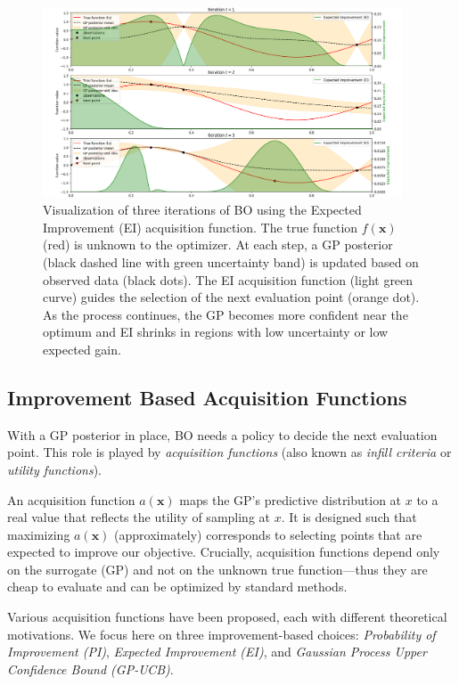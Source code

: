 \documentclass{ut-thesis}
\begin{document}
\begin{figure}[htbp]
    \centering
    \includegraphics[width=0.95\textwidth]{Bo_visual.png}
    \caption[Bayesian Optimization with Expected Improvement]{
        Visualization of three iterations of BO using the Expected Improvement (EI) acquisition function. 
        The true function \( f(\mathbf{x}) \) (red) is unknown to the optimizer. At each step, a GP posterior (black dashed line with green uncertainty band) is updated based on observed data (black dots). 
        The EI acquisition function (light green curve) guides the selection of the next evaluation point (orange dot). 
        As the process continues, the GP becomes more confident near the optimum and EI shrinks in regions with low uncertainty or low expected gain.
    }
    \label{fig:bo_ei_iterations}
\end{figure}

\subsection{Improvement Based Acquisition Functions}

With a GP posterior in place, BO needs a policy to decide the next evaluation point. This role is played by \emph{acquisition functions} (also known as \emph{infill criteria} or \emph{utility functions}). 

An acquisition function $a(\mathbf{x})$ maps the GP’s predictive distribution at $x$ to a real value that reflects the utility of sampling at $x$. It is designed such that maximizing $a(\mathbf{x})$ (approximately) corresponds to selecting points that are expected to improve our objective. Crucially, acquisition functions depend only on the surrogate (GP) and not on the unknown true function---thus they are cheap to evaluate and can be optimized by standard methods.

Various acquisition functions have been proposed, each with different theoretical motivations. We focus here on three improvement-based choices: \emph{Probability of Improvement (PI)}, \emph{Expected Improvement (EI)}, and \emph{Gaussian Process Upper Confidence Bound (GP-UCB)}.
\end{document}
